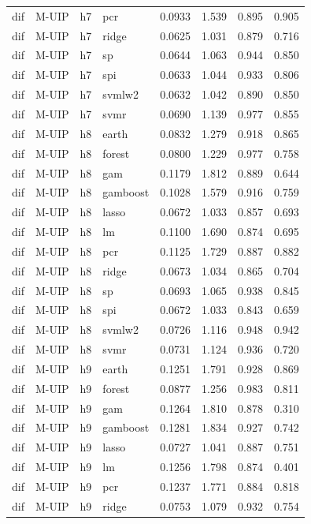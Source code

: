\begin{ThreePartTable}
\begin{longtable}[t]{llclcccc}
dif & M-UIP & h7 & pcr & 0.0933 & 1.539 & 0.895 & 0.905\\
dif & M-UIP & h7 & ridge & 0.0625 & 1.031 & 0.879 & 0.716\\
dif & M-UIP & h7 & sp & 0.0644 & 1.063 & 0.944 & 0.850\\
dif & M-UIP & h7 & spi & 0.0633 & 1.044 & 0.933 & 0.806\\
dif & M-UIP & h7 & svmlw2 & 0.0632 & 1.042 & 0.890 & 0.850\\
dif & M-UIP & h7 & svmr & 0.0690 & 1.139 & 0.977 & 0.855\\
\addlinespace
dif & M-UIP & h8 & earth & 0.0832 & 1.279 & 0.918 & 0.865\\
dif & M-UIP & h8 & forest & 0.0800 & 1.229 & 0.977 & 0.758\\
dif & M-UIP & h8 & gam & 0.1179 & 1.812 & 0.889 & 0.644\\
dif & M-UIP & h8 & gamboost & 0.1028 & 1.579 & 0.916 & 0.759\\
dif & M-UIP & h8 & lasso & 0.0672 & 1.033 & 0.857 & 0.693\\
dif & M-UIP & h8 & lm & 0.1100 & 1.690 & 0.874 & 0.695\\
dif & M-UIP & h8 & pcr & 0.1125 & 1.729 & 0.887 & 0.882\\
dif & M-UIP & h8 & ridge & 0.0673 & 1.034 & 0.865 & 0.704\\
dif & M-UIP & h8 & sp & 0.0693 & 1.065 & 0.938 & 0.845\\
dif & M-UIP & h8 & spi & 0.0672 & 1.033 & 0.843 & 0.659\\
dif & M-UIP & h8 & svmlw2 & 0.0726 & 1.116 & 0.948 & 0.942\\
dif & M-UIP & h8 & svmr & 0.0731 & 1.124 & 0.936 & 0.720\\
\addlinespace
dif & M-UIP & h9 & earth & 0.1251 & 1.791 & 0.928 & 0.869\\
dif & M-UIP & h9 & forest & 0.0877 & 1.256 & 0.983 & 0.811\\
dif & M-UIP & h9 & gam & 0.1264 & 1.810 & 0.878 & 0.310\\
dif & M-UIP & h9 & gamboost & 0.1281 & 1.834 & 0.927 & 0.742\\
dif & M-UIP & h9 & lasso & 0.0727 & 1.041 & 0.887 & 0.751\\
dif & M-UIP & h9 & lm & 0.1256 & 1.798 & 0.874 & 0.401\\
dif & M-UIP & h9 & pcr & 0.1237 & 1.771 & 0.884 & 0.818\\
dif & M-UIP & h9 & ridge & 0.0753 & 1.079 & 0.932 & 0.754\\

\end{longtable}
\end{ThreePartTable}
